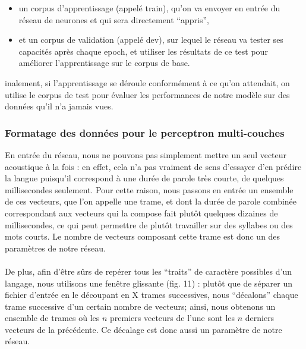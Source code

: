 \documentclass{article}
\begin{document}
\begin{itemize}
\item un corpus d'apprentissage (appelé train), qu'on va envoyer en entrée du réseau de neurones et qui sera directement ``appris'',
\item et un corpus de validation (appelé dev), sur lequel le réseau va tester ses capacités après chaque epoch, et utiliser les résultats de ce test pour améliorer l'apprentissage sur le corpus de base.
\end{itemize}

\noindent inalement, si l'apprentissage se déroule conformément à ce qu'on attendait, on utilise le corpus de test pour évaluer les performances de notre modèle sur des données qu'il n'a jamais vues.
\newpage
\subsubsection{Formatage des données pour le perceptron multi-couches}

En entrée du réseau, nous ne pouvons pas simplement mettre un seul vecteur acoustique à la fois : en effet, cela n'a pas vraiment de sens d'essayer d'en prédire la langue puisqu'il correspond à une durée de parole très courte, de quelques millisecondes seulement. Pour cette raison, nous passons en entrée un ensemble de ces vecteurs, que l'on appelle une trame, et dont la durée de parole combinée correspondant aux vecteurs qui la compose fait plutôt quelques dizaines de millisecondes, ce qui peut permettre de plutôt travailler sur des syllabes ou des mots courts. Le nombre de vecteurs composant cette trame est donc un des paramètres de notre réseau.\\
 \\
De plus, afin d'être sûrs de repérer tous les ``traits'' de caractère possibles d'un langage, nous utilisons une fenêtre glissante (fig. 11) : plutôt que de séparer un fichier d'entrée en le découpant en X trames successives, nous ``décalons'' chaque trame successive d'un certain nombre de vecteurs; ainsi, nous obtenons un ensemble de trames où les $n$ premiers vecteurs de l'une sont les $n$ derniers vecteurs de la précédente. Ce décalage est donc aussi un paramètre de notre réseau.
\end{document}
